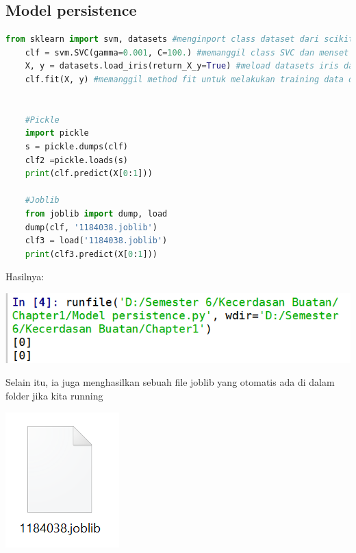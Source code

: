 \documentclass{homework}
\begin{document}
\subsection{Model persistence}
\begin{lstlisting}[language=Python]
    from sklearn import svm, datasets #menginport class dataset dari scikit learn library
    clf = svm.SVC(gamma=0.001, C=100.) #memanggil class SVC dan menset argumen constructor SVC serta ditampung di variabel clf
    X, y = datasets.load_iris(return_X_y=True) #meload datasets iris dan ditampung di variabel x untuk data dan y untuk target
    clf.fit(X, y) #memanggil method fit untuk melakukan training data dengan argumen data dan target dari datasets iris
    
    
    #Pickle
    import pickle
    s = pickle.dumps(clf)
    clf2 =pickle.loads(s)
    print(clf.predict(X[0:1]))
    
    #Joblib
    from joblib import dump, load
    dump(clf, '1184038.joblib')
    clf3 = load('1184038.joblib')
    print(clf3.predict(X[0:1]))
 \end{lstlisting}
 Hasilnya:
 \begin{center}
    \includegraphics[width=.8\textwidth]{Pict/hasil4.PNG}
\end{center}
Selain itu, ia juga menghasilkan sebuah file joblib yang otomatis ada di dalam folder jika kita running
 \begin{center}
    \includegraphics[width=.8\textwidth]{Pict/joblib.PNG}
\end{center}
\end{document}

